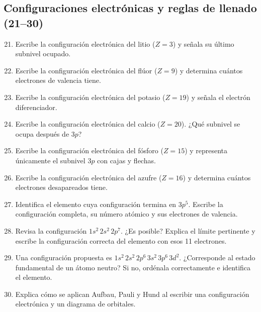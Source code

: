 \documentclass[12pt, letterpaper]{article}
\begin{document}
\subsection{Configuraciones electrónicas y reglas de llenado (21--30)}
\begin{enumerate}[leftmargin=*, label=\textbf{\arabic*.}]
  \setcounter{enumi}{20}
  \item \facil{} Escribe la configuración electrónica del litio ($Z=3$) y señala su último subnivel ocupado.
  \item \facil{} Escribe la configuración electrónica del flúor ($Z=9$) y determina cuántos electrones de valencia tiene.
  \item \medio{} Escribe la configuración electrónica del potasio ($Z=19$) y señala el electrón diferenciador.
  \item \medio{} Escribe la configuración electrónica del calcio ($Z=20$). ¿Qué subnivel se ocupa después de $3p$?
  \item \medio{} Escribe la configuración electrónica del fósforo ($Z=15$) y representa únicamente el subnivel $3p$ con cajas y flechas.
  \item \medio{} Escribe la configuración electrónica del azufre ($Z=16$) y determina cuántos electrones desapareados tiene.
  \item \dificil{} Identifica el elemento cuya configuración termina en $3p^5$. Escribe la configuración completa, su número atómico y sus electrones de valencia.
  \item \medio{} Revisa la configuración $1s^2\,2s^2\,2p^7$. ¿Es posible? Explica el límite pertinente y escribe la configuración correcta del elemento con esos 11 electrones.
  \item \dificil{} Una configuración propuesta es $1s^2\,2s^2\,2p^6\,3s^2\,3p^6\,3d^2$. ¿Corresponde al estado fundamental de un átomo neutro? Si no, ordénala correctamente e identifica el elemento.
  \item \medio{} Explica cómo se aplican Aufbau, Pauli y Hund al escribir una configuración electrónica y un diagrama de orbitales.
\end{enumerate}
\end{document}
